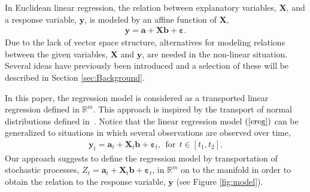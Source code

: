 \documentclass[runningheads,a4paper]{llncs}
\newcommand{\R}{\mathbb R}
\begin{document}

In Euclidean linear regression, the relation between explanatory variables, $\boldsymbol{X}$, and a response variable, $\boldsymbol{y}$, is modeled by an affine function of $\boldsymbol{X}$,
\begin{align}
    \boldsymbol{y} = \boldsymbol{a} + \boldsymbol{X}\boldsymbol{b} + \boldsymbol{\varepsilon}.
    \label{ereg}
\end{align}
Due to the lack of vector space structure, alternatives for modeling relations between the given variables, $\boldsymbol{X}$ and $\boldsymbol{y}$, are needed in the non-linear situation. Several ideas have previously been introduced and a selection of these will be described in Section \ref{sec:Background}.

In this paper, the regression model is considered as a transported linear regression defined in $\R^m$. This approach is inspired by the transport of normal distributions defined in~\cite{sommer_anisotropic}. Notice that the linear regression model $(\ref{ereg})$ can be generalized to situations in which several observations are observed over time,
\begin{align}
    \boldsymbol{y}_t = \boldsymbol{a}_t + \boldsymbol{X}_t\boldsymbol{b} + \boldsymbol{\varepsilon}_t, \ \ \text{for} \ \ t\in [t_1,t_2].
\label{treg}
\end{align}
 Our approach suggests to define the regression model by transportation of stochastic processes, $Z_t = \boldsymbol{a}_t + \boldsymbol{X}_t\boldsymbol{b} + \boldsymbol{\varepsilon}_t$, in $\R^m$ on to the manifold in order to obtain the relation to the response variable, $\boldsymbol{y}$ (see Figure \ref{fig:model}).

\end{document}
